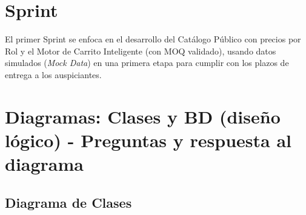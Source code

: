 \documentclass[12pt,a4paper]{report}
\begin{document}
\section{Sprint}
El primer Sprint se enfoca en el desarrollo del Catálogo Público con precios por Rol y el Motor de Carrito Inteligente (con MOQ validado), usando datos simulados (\textit{Mock Data}) en una primera etapa para cumplir con los plazos de entrega a los auspiciantes.

\section{Diagramas: Clases y BD (diseño lógico) - Preguntas y respuesta al diagrama}

\subsection*{Diagrama de Clases}
\end{document}
